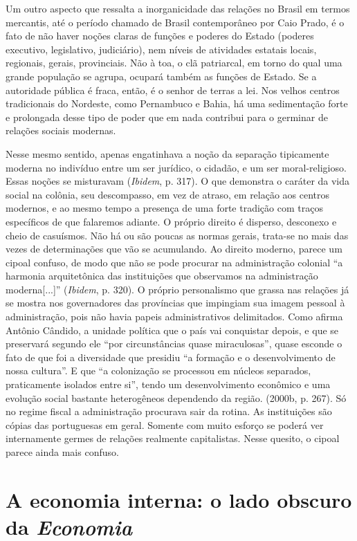 Um outro aspecto que ressalta a inorganicidade das relações no Brasil em
termos mercantis, até o período chamado de Brasil contemporâneo por Caio
Prado, é o fato de não haver noções claras de funções e poderes do
Estado (poderes executivo, legislativo, judiciário), nem níveis de
atividades estatais locais, regionais, gerais, provinciais. Não à toa, o
clã patriarcal, em torno do qual uma grande população se agrupa, ocupará
também as funções de Estado. Se a autoridade pública é fraca, então, é o
senhor de terras a lei. Nos velhos centros tradicionais do Nordeste,
como Pernambuco e Bahia, há uma sedimentação forte e prolongada desse
tipo de poder que em nada contribui para o germinar de relações sociais
modernas.

Nesse mesmo sentido, apenas engatinhava a noção da separação tipicamente
moderna no indivíduo entre um ser jurídico, o cidadão, e um ser
moral-religioso. Essas noções se misturavam (\emph{Ibidem}, p. 317). O
que demonstra o caráter da vida social na colônia, seu descompasso, em
vez de atraso, em relação aos centros modernos, e ao mesmo tempo a
presença de uma forte tradição com traços específicos de que falaremos
adiante. O próprio direito é disperso, desconexo e cheio de casuísmos.
Não há ou são poucas as normas gerais, trata-se no mais das vezes de
determinações que vão se acumulando. Ao direito moderno, parece um
cipoal confuso, de modo que não se pode procurar na administração
colonial ``a harmonia arquitetônica das instituições que observamos na
administração moderna{[}...{]}'' (\emph{Ibidem}, p. 320). O próprio
personalismo que grassa nas relações já se mostra nos governadores das
províncias que impingiam sua imagem pessoal à administração, pois não
havia papeis administrativos delimitados. Como afirma Antônio Cândido, a
unidade política que o país vai conquistar depois, e que se preservará
segundo ele ``por circunstâncias quase miraculosas'', quase esconde o
fato de que foi a diversidade que presidiu ``a formação e o
desenvolvimento de nossa cultura''. E que ``a colonização se processou
em núcleos separados, praticamente isolados entre si'', tendo um
desenvolvimento econômico e uma evolução social bastante heterogêneos
dependendo da região. (2000b, p. 267). Só no regime fiscal a
administração procurava sair da rotina. As instituições são cópias das
portuguesas em geral. Somente com muito esforço se poderá ver
internamente germes de relações realmente capitalistas. Nesse quesito, o
cipoal parece ainda mais confuso.

\section{A economia interna: o lado obscuro da \emph{Economia}}

